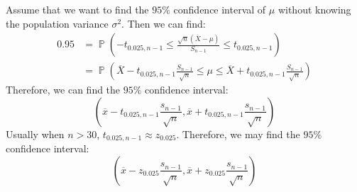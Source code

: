\documentclass{huhtakm-template-book-v2}
\DeclareMathOperator{\prob}{\mathbb{P}}
\begin{document}
\begin{eg}
	Assume that we want to find the $95\%$ confidence interval of $\mu$ without knowing the population variance $\sigma^{2}$. Then we can find:
	\begin{align*}
		0.95&=\prob\left(-t_{0.025,n-1}\leq\frac{\sqrt{n}(\overline{X}-\mu)}{S_{n-1}}\leq t_{0.025,n-1}\right)\\
		&=\prob\left(\overline{X}-t_{0.025,n-1}\frac{S_{n-1}}{\sqrt{n}}\leq\mu\leq\overline{X}+t_{0.025,n-1}\frac{S_{n-1}}{\sqrt{n}}\right)
	\end{align*}
	Therefore, we can find the $95\%$ confidence interval:
	\begin{equation*}
		\left(\overline{x}-t_{0.025,n-1}\frac{s_{n-1}}{\sqrt{n}},\overline{x}+t_{0.025,n-1}\frac{s_{n-1}}{\sqrt{n}}\right)
	\end{equation*}
	Usually when $n>30$, $t_{0.025,n-1}\approx z_{0.025}$. Therefore, we may find the $95\%$ confidence interval:
	\begin{equation*}
		\left(\overline{x}-z_{0.025}\frac{s_{n-1}}{\sqrt{n}},\overline{x}+z_{0.025}\frac{s_{n-1}}{\sqrt{n}}\right)
	\end{equation*}
\end{eg}
\end{document}
